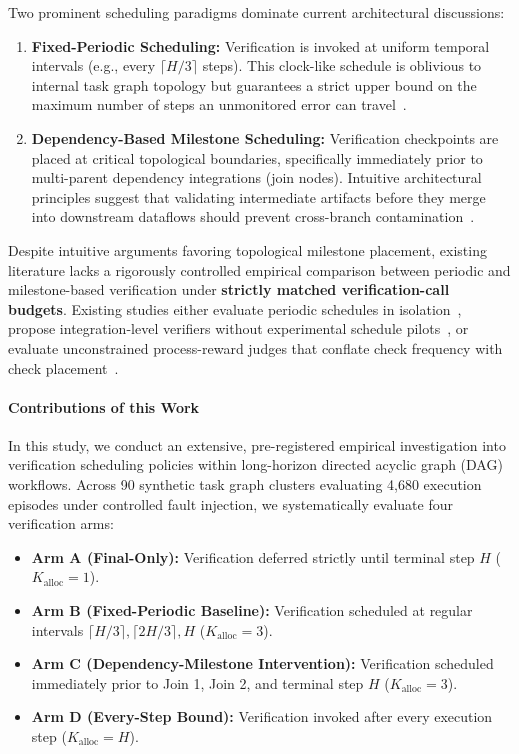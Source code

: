 Two prominent scheduling paradigms dominate current architectural discussions:
\begin{enumerate}
    \item \textbf{Fixed-Periodic Scheduling:} Verification is invoked at uniform temporal intervals (e.g., every $\lceil H/3 \rceil$ steps). This clock-like schedule is oblivious to internal task graph topology but guarantees a strict upper bound on the maximum number of steps an unmonitored error can travel~\citep{yang2025agenticrobot}.
    \item \textbf{Dependency-Based Milestone Scheduling:} Verification checkpoints are placed at critical topological boundaries, specifically immediately prior to multi-parent dependency integrations (join nodes). Intuitive architectural principles suggest that validating intermediate artifacts before they merge into downstream dataflows should prevent cross-branch contamination~\citep{afoud2026vreact}.
\end{enumerate}

Despite intuitive arguments favoring topological milestone placement, existing literature lacks a rigorously controlled empirical comparison between periodic and milestone-based verification under \textbf{strictly matched verification-call budgets}. Existing studies either evaluate periodic schedules in isolation~\citep{yang2025agenticrobot}, propose integration-level verifiers without experimental schedule pilots~\citep{afoud2026vreact}, or evaluate unconstrained process-reward judges that conflate check frequency with check placement~\citep{venkataramani2026masprove}.

\paragraph{Contributions of this Work}
In this study, we conduct an extensive, pre-registered empirical investigation into verification scheduling policies within long-horizon directed acyclic graph (DAG) workflows. Across 90 synthetic task graph clusters evaluating 4,680 execution episodes under controlled fault injection, we systematically evaluate four verification arms:
\begin{itemize}
    \item \textbf{Arm A (Final-Only):} Verification deferred strictly until terminal step $H$ ($K_{\text{alloc}} = 1$).
    \item \textbf{Arm B (Fixed-Periodic Baseline):} Verification scheduled at regular intervals $\lceil H/3 \rceil, \lceil 2H/3 \rceil, H$ ($K_{\text{alloc}} = 3$).
    \item \textbf{Arm C (Dependency-Milestone Intervention):} Verification scheduled immediately prior to Join 1, Join 2, and terminal step $H$ ($K_{\text{alloc}} = 3$).
    \item \textbf{Arm D (Every-Step Bound):} Verification invoked after every execution step ($K_{\text{alloc}} = H$).
\end{itemize}

